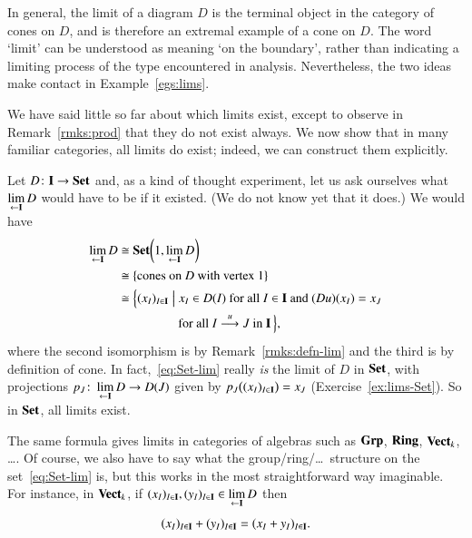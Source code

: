 In general, the limit of a diagram $D$ is the terminal object in the
category of cones on $D$, and is therefore an extremal example of a cone on
$D$.  The word `limit' can be understood as meaning `on the boundary',
rather than indicating a limiting process of the type encountered in
analysis.  Nevertheless, the two ideas make contact in
Example~\ref{egs:lims}.

We have said little so far about which limits exist, except to observe in
Remark~\ref{rmks:prod} that they do not exist
always.  We now show that in many familiar categories, all limits do exist;
indeed, we can construct them explicitly.

\begin{example} 
\label{eg:lims-Set}
Let $D\from \scat{I} \to \Set$ and, as a kind of thought%
%
%
experiment, let us ask ourselves what $\lim\limits_{\leftarrow \mathbf{I}} D$%
%
%
would have to be if it existed.  (We do not know yet that it does.)  We
would have
% 
\begin{align}
\lt{\scat{I}} D        &
\iso   \Set\biggl(1, \lt{\scat{I}} D\biggr)      
\nonumber       \\
                        &
\iso   
\{ \text{cones on } D \text{ with vertex } 1 \}             
\nonumber       \\
                        &\iso         
\Bigl\{ 
(x_I)_{I \in \scat{I}} 
\Bigsuch
x_I \in D(I) \text{ for all } I \in \scat{I} \text{ and }
(Du)(x_I) = x_J 
\nonumber \\
        &
\phantom{\iso \Bigl\{ (x_I)_{I \in \scat{I}} \Bigsuch {}}
\text{ for all } I \toby{u} J \text{ in }
\scat{I} 
\,\Bigr\},
\label{eq:Set-lim}
\end{align}
% 
where the second isomorphism is by
Remark~\ref{rmks:defn-lim} and the third is by
definition of cone.  In fact,~\eqref{eq:Set-lim} really \emph{is} the limit
of $D$ in $\mathbf{Set}$, with projections $p_J\from \lt{\scat{I}} D \to D(J)$
given by $p_J\bigl( (x_I)_{I \in \mathbf{I}} \bigr) = x_J$
(Exercise~\ref{ex:lims-Set}).  So in $\mathbf{Set}$, all limits exist.
\end{example}

\begin{example} 
\label{eg:lims-alg}
The same formula gives limits in categories of algebras such as $\mathbf{Grp}$,%
%
%
$\mathbf{Ring}$,%
%
%
$\mathbf{Vect}_k$,%
%
%
\ldots.  Of course, we also have to say what the
group/ring/\ldots\ structure on the set~\eqref{eq:Set-lim} is, but this
works in the most straightforward way imaginable.  For instance, in
$\mathbf{Vect}_k$, if $(x_I)_{I \in \mathbf{I}}, (y_I)_{I \in \mathbf{I}} \in
\lim\limits_{\leftarrow \mathbf{I}} D$ then
\[
(x_I)_{I \in \mathbf{I}} + (y_I)_{I \in \mathbf{I}}
=
(x_I + y_I)_{I \in \mathbf{I}}.
\]
\end{example}


